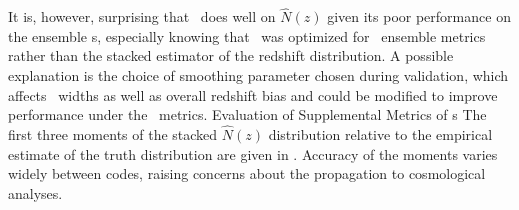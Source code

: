 It is, however, surprising that \tpz\ does well on $\hat{N}(z)$ given its poor performance on the ensemble \pzpdf s, especially knowing that \tpz\ was optimized for \pzpdf\ ensemble metrics rather than the stacked estimator of the redshift distribution.
A possible explanation is the choice of smoothing parameter chosen during validation, which affects \pzpdf\ widths as well as overall redshift bias and could be modified to improve performance under the \pzpdf\ metrics.
Evaluation of Supplemental Metrics of \Pzpdf s
The first three moments of the stacked $\hat{N}(z)$ distribution relative to the empirical estimate of the truth distribution are given in .
Accuracy of the moments varies widely between codes, raising concerns about the propagation to cosmological analyses.


